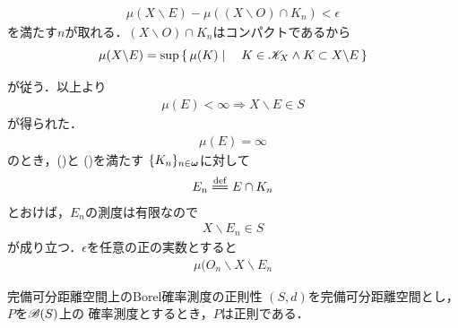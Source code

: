 \begin{sketch}
\begin{description}
					\begin{align}
						\mu(X \backslash E) - \mu((X \backslash O) \cap K_n) < \epsilon
					\end{align}
					を満たす$n$が取れる．$(X \backslash O) \cap K_n$はコンパクトであるから
					\begin{align}
						\mu(X \backslash E) = \operatorname*{sup}_{} \left\{\, \mu(K) \mid \quad K \in \mathscr{K}_X \wedge K \subset X \backslash E\, \right\}
					\end{align}
					が従う．以上より
					\begin{align}
						\mu(E) < \infty \Longrightarrow X \backslash E \in S
					\end{align}
					が得られた．
					\begin{align}
						\mu(E) = \infty
					\end{align}
					のとき，()と
					()を満たす
					$\{K_n\}_{n \in {\boldsymbol \omega}}$に対して
					\begin{align}
						E_n \defeq E \cap K_n
					\end{align}
					とおけば，$E_n$の測度は有限なので
					\begin{align}
						X \backslash E_n \in S
					\end{align}
					が成り立つ．$\epsilon$を任意の正の実数とすると
					\begin{align}
						\mu(O_n \backslash X \backslash E_n
					\end{align}
			\end{description}
		\end{sketch}
		
		\begin{screen}
			\begin{thm}[正則正値測度空間のLebesgue拡大も正則正値測度空間]
				
			\end{thm}
		\end{screen}
		
		\begin{itembox}[l]{完備可分距離空間上のBorel確率測度の正則性}
		$(S,d)$を完備可分距離空間とし，$P$を$\mathscr{B}(S)$上の
		確率測度とするとき，$P$は正則である．
	\end{itembox}
	

